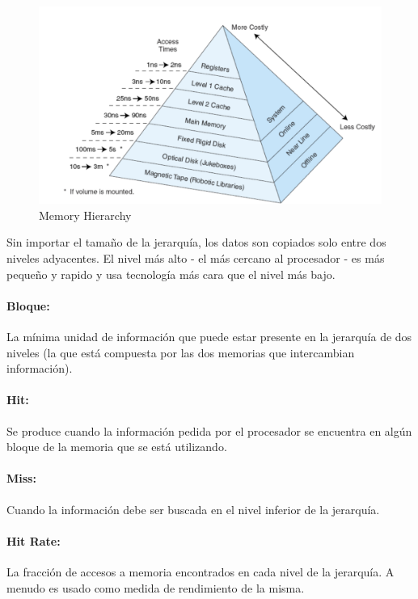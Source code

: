 \begin{figure}[ht]
	\centering
	\includegraphics[width=1\textwidth]{imagenes/memory-heriarchy}
	\caption{Memory Hierarchy}
	\label{fig:memory-hierarchy}
\end{figure}

Sin importar el tamaño de la jerarquía, los datos son copiados solo entre dos niveles adyacentes. El nivel más alto - el más cercano al procesador - es más pequeño y rapido y usa tecnología más cara que el nivel más bajo.

\paragraph{Bloque:} La mínima unidad de información que puede estar presente en la jerarquía de dos niveles (la que está compuesta por las dos memorias que intercambian información).

\paragraph{Hit:} Se produce cuando la información pedida por el procesador se encuentra en algún bloque de la memoria que se está utilizando.

\paragraph{Miss:} Cuando la información debe ser buscada en el nivel inferior de la jerarquía.

\paragraph{Hit Rate:} La fracción de accesos a memoria encontrados en cada nivel de la jerarquía. A menudo es usado como medida de rendimiento de la misma.

